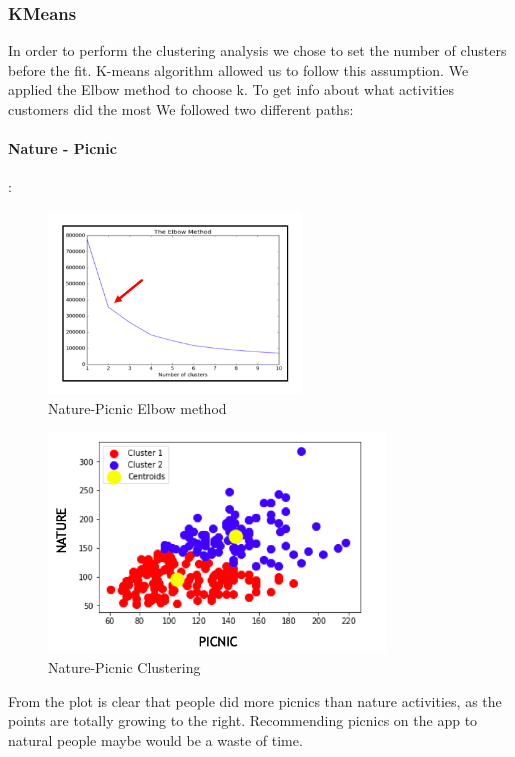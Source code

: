 \clearpage
\subsubsection{KMeans}
In order to perform the clustering analysis we chose to set the number of clusters before the fit. K-means algorithm allowed us to follow this assumption. We applied the Elbow method to choose k. To get info about what activities customers did the most We followed two different paths: 

\paragraph*{Nature - Picnic}:
\begin{figure}[H]
\centering
\includegraphics[width=0.6\textwidth]{Img/2_elbow.png}
\caption{Nature-Picnic Elbow method}
\end{figure}

\begin{figure}[H]
\centering
\hspace{-1cm}
\includegraphics[width=0.8\textwidth]{Img/2_cluster.png}
	\caption{Nature-Picnic Clustering}
\end{figure}
\noindent From the plot is clear that people did more picnics than nature activities, as the points are totally growing to the right. Recommending picnics on the app to natural people maybe would be a waste of time.
\clearpage

